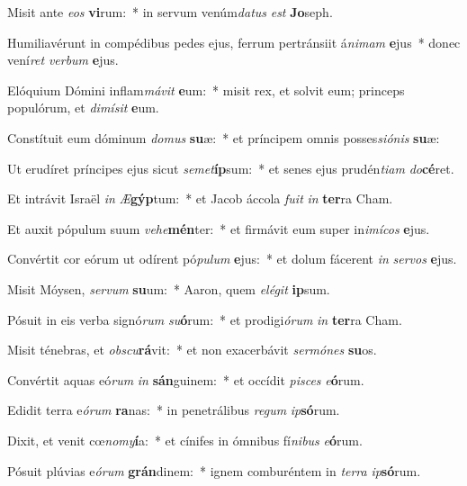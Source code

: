 \item Misit ante \textit{e}\textit{os} \textbf{vi}rum:~* in servum venúm\textit{da}\textit{tus} \textit{est} \textbf{Jo}seph.
\item Humiliavérunt in compédibus pedes ejus, ferrum pertránsiit á\textit{ni}\textit{mam} \textbf{e}jus~* donec vení\textit{ret} \textit{ver}\textit{bum} \textbf{e}jus.
\item Elóquium Dómini inflam\textit{má}\textit{vit} \textbf{e}um:~* misit rex, et solvit eum; princeps populórum, et \textit{di}\textit{mí}\textit{sit} \textbf{e}um.
\item Constítuit eum dóminum \textit{do}\textit{mus} \textbf{su}æ:~* et príncipem omnis posses\textit{si}\textit{ó}\textit{nis} \textbf{su}æ:
\item Ut erudíret príncipes ejus sicut \textit{se}\textit{met}\textbf{íp}sum:~* et senes ejus prudén\textit{ti}\textit{am} \textit{do}\textbf{cé}ret.
\item Et intrávit Israël \textit{in} \textit{Æ}\textbf{gýp}tum:~* et Jacob áccola \textit{fu}\textit{it} \textit{in} \textbf{ter}ra Cham.
\item Et auxit pópulum suum \textit{ve}\textit{he}\textbf{mén}ter:~* et firmávit eum super in\textit{i}\textit{mí}\textit{cos} \textbf{e}jus.
\item Convértit cor eórum ut odírent pó\textit{pu}\textit{lum} \textbf{e}jus:~* et dolum fácerent \textit{in} \textit{ser}\textit{vos} \textbf{e}jus.
\item Misit Móysen, \textit{ser}\textit{vum} \textbf{su}um:~* Aaron, quem \textit{e}\textit{lé}\textit{git} \textbf{ip}sum.
\item Pósuit in eis verba signó\textit{rum} \textit{su}\textbf{ó}rum:~* et prodigi\textit{ó}\textit{rum} \textit{in} \textbf{ter}ra Cham.
\item Misit ténebras, et \textit{obs}\textit{cu}\textbf{rá}vit:~* et non exacerbávit \textit{ser}\textit{mó}\textit{nes} \textbf{su}os.
\item Convértit aquas eó\textit{rum} \textit{in} \textbf{sán}guinem:~* et occídit \textit{pi}\textit{sces} \textit{e}\textbf{ó}rum.
\item Edidit terra e\textit{ó}\textit{rum} \textbf{ra}nas:~* in penetrálibus \textit{re}\textit{gum} \textit{ip}\textbf{só}rum.
\item Dixit, et venit cœ\textit{no}\textit{my}\textbf{í}a:~* et cínifes in ómnibus fí\textit{ni}\textit{bus} \textit{e}\textbf{ó}rum.
\item Pósuit plúvias e\textit{ó}\textit{rum} \textbf{grán}dinem:~* ignem comburéntem in \textit{ter}\textit{ra} \textit{ip}\textbf{só}rum.
